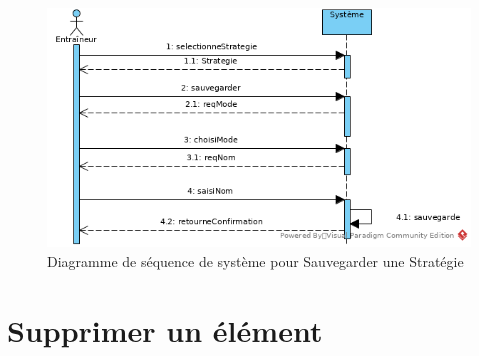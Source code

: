 \begin{figure}[htpb]
    \centering
    \includegraphics[scale=0.5]{fig/ssd_sauvegarder_strategie.png}
    \caption{Diagramme de s\'equence de syst\`eme pour Sauvegarder une Strat\'egie}
    \label{fig:ssd_sauvegarder_strategie}
\end{figure}



\newpage
\section{Supprimer un \'el\'ement}
\label{sec:supprimer_un_'el'ement}

